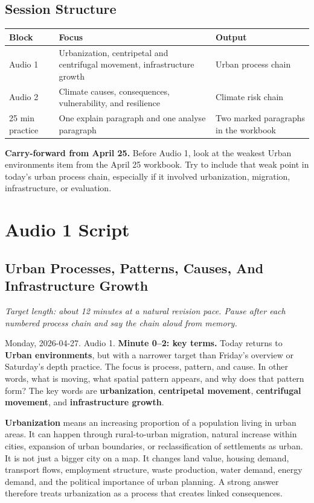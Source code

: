 \documentclass[11pt,a4paper]{article}
\newcommand{\term}[1]{\textcolor{HeadingBlue}{\textbf{#1}}}
\newcommand{\boxnote}[3]{%
\noindent\colorbox{#1}{%
  \begin{minipage}{0.965\textwidth}
  \sffamily
  \textbf{\textcolor{HeadingBlue}{#2}} #3
  \end{minipage}
}}
\begin{document}
\subsection{Session Structure}

\begin{tabularx}{\textwidth}{L{0.18\textwidth}Y L{0.22\textwidth}}
\toprule
\textbf{Block} & \textbf{Focus} & \textbf{Output} \\
\midrule
Audio 1 & Urbanization, centripetal and centrifugal movement, infrastructure
growth & Urban process chain \\
Audio 2 & Climate causes, consequences, vulnerability, and resilience & Climate
risk chain \\
25 min practice & One explain paragraph and one analyse paragraph & Two marked
paragraphs in the workbook \\
\bottomrule
\end{tabularx}

\boxnote{SoftTint}{Carry-forward from April 25.}{Before Audio 1, look at the
weakest Urban environments item from the April 25 workbook. Try to include that
weak point in today's urban process chain, especially if it involved
urbanization, migration, infrastructure, or evaluation.}

\section{Audio 1 Script}
\subsection{Urban Processes, Patterns, Causes, And Infrastructure Growth}

\textit{Target length: about 12 minutes at a natural revision pace. Pause after
each numbered process chain and say the chain aloud from memory.}

Monday, 2026-04-27. Audio 1. \textbf{Minute 0--2: key terms.}
Today returns to \term{Urban environments}, but with a narrower target than
Friday's overview or Saturday's depth practice. The focus is process, pattern,
and cause. In other words, what is moving, what spatial pattern appears, and why
does that pattern form? The key words are \term{urbanization},
\term{centripetal movement}, \term{centrifugal movement}, and
\term{infrastructure growth}.

\term{Urbanization} means an increasing proportion of a population living in
urban areas. It can happen through rural-to-urban migration, natural increase
within cities, expansion of urban boundaries, or reclassification of settlements
as urban. It is not just a bigger city on a map. It changes land value, housing
demand, transport flows, employment structure, waste production, water demand,
energy demand, and the political importance of urban planning. A strong answer
therefore treats urbanization as a process that creates linked consequences.
\end{document}
